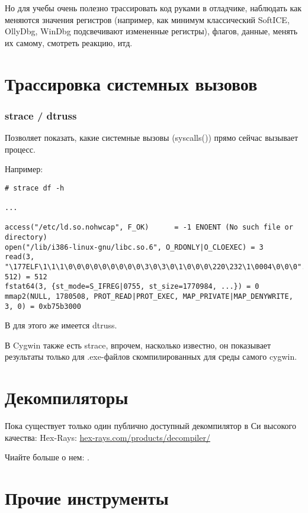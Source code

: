 Но для учебы очень полезно трассировать код руками в отладчике, наблюдать как меняются значения регистров 
(например, как минимум классический SoftICE, OllyDbg, WinDbg подсвечивают измененные регистры), 
флагов, данные, менять их самому, смотреть реакцию, итд.

\section{Трассировка системных вызовов}

\label{strace}
\subsubsection{strace / dtruss}

Позволяет показать, какие системные вызовы (syscalls()) прямо сейчас вызывает процесс.

Например:

\begin{lstlisting}
# strace df -h

...

access("/etc/ld.so.nohwcap", F_OK)      = -1 ENOENT (No such file or directory)
open("/lib/i386-linux-gnu/libc.so.6", O_RDONLY|O_CLOEXEC) = 3
read(3, "\177ELF\1\1\1\0\0\0\0\0\0\0\0\0\3\0\3\0\1\0\0\0\220\232\1\0004\0\0\0"..., 512) = 512
fstat64(3, {st_mode=S_IFREG|0755, st_size=1770984, ...}) = 0
mmap2(NULL, 1780508, PROT_READ|PROT_EXEC, MAP_PRIVATE|MAP_DENYWRITE, 3, 0) = 0xb75b3000
\end{lstlisting}

\myindex{\MacOSX}
В \MacOSX для этого же имеется dtruss.

В Cygwin также есть strace, впрочем, насколько известно, 
он показывает результаты только для .exe-файлов скомпилированных для среды самого cygwin.

\section{Декомпиляторы}

Пока существует только один публично доступный декомпилятор в Си высокого качества: Hex-Rays:
\href{http://go.yurichev.com/17033}{hex-rays.com/products/decompiler/}

Чиайте больше о нем: .


\section{Прочие инструменты}

